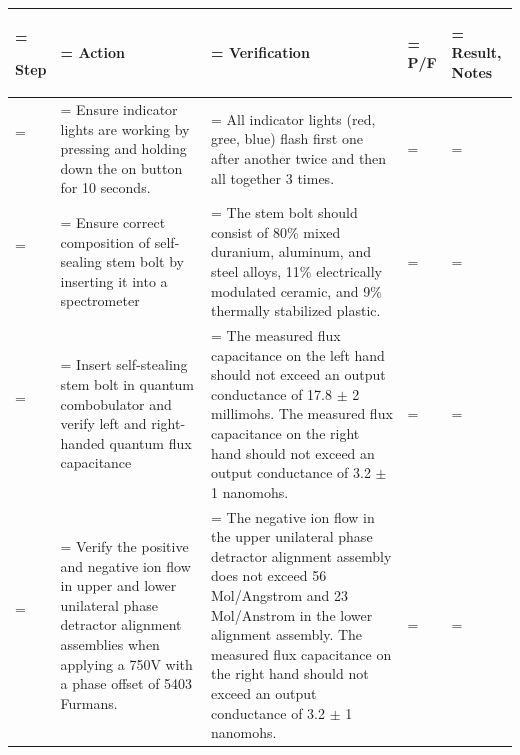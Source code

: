 \documentclass[a4paper,12pt]{article}
\theoremstyle{definition}
\newcounter{teststepctr}
\def\arraystretch{1.5}%
\begin{document}
\small
\def\arraystretch{1.5}%
\begin{xltabular}{\textwidth}{
	|>{\hsize\linewidth=\hsize}X
	|>{\hsize\linewidth=\hsize}X
	|>{\hsize\linewidth=\hsize}X
	|>{\hsize\linewidth=\hsize}X
	|>{\hsize\linewidth=\hsize}X
	|
	}
	\hline


	Step  &
	Action  &
	Verification  &
	P/F  &
	Result, Notes   \\ \hline \endhead
	\addtocounter{teststepctr}{1} \theteststepctr \ &
	Ensure indicator lights are working by pressing and holding down the on button for 10 seconds.&
	All indicator lights (red, gree, blue) flash first one after another twice and then all together 3 times.
	&

	&

	\\ \hline

	\addtocounter{teststepctr}{1} \theteststepctr \ &
	Ensure correct composition of self-sealing stem bolt by inserting it into a spectrometer &
	The stem bolt should consist of 80\% mixed duranium, aluminum, and steel alloys, 11\% electrically modulated ceramic, and 9\% thermally stabilized plastic.
	&

	&

	\\ \hline

	\addtocounter{teststepctr}{1} \theteststepctr \ &
	Insert self-stealing stem bolt in quantum combobulator and verify left and right-handed quantum flux capacitance &
	The measured flux capacitance on the left hand should not exceed an output conductance of 17.8 $\pm$ 2 millimohs.
	The measured flux capacitance on the right hand should not exceed an output conductance of 3.2 $\pm$ 1 nanomohs.
	&

	&

	\\ \hline

	\addtocounter{teststepctr}{1} \theteststepctr \ &
	Verify the positive and negative ion flow in upper and lower unilateral phase detractor alignment assemblies when applying a 750V with a phase offset of 5403 Furmans.  &
	The negative ion flow in the upper unilateral phase detractor alignment assembly does not exceed 56 Mol/Angstrom and 23 Mol/Anstrom in the lower alignment assembly.
	The measured flux capacitance on the right hand should not exceed an output conductance of 3.2 $\pm$ 1 nanomohs.
	&

	&

	\\ \hline


\end{xltabular}
\end{document}

